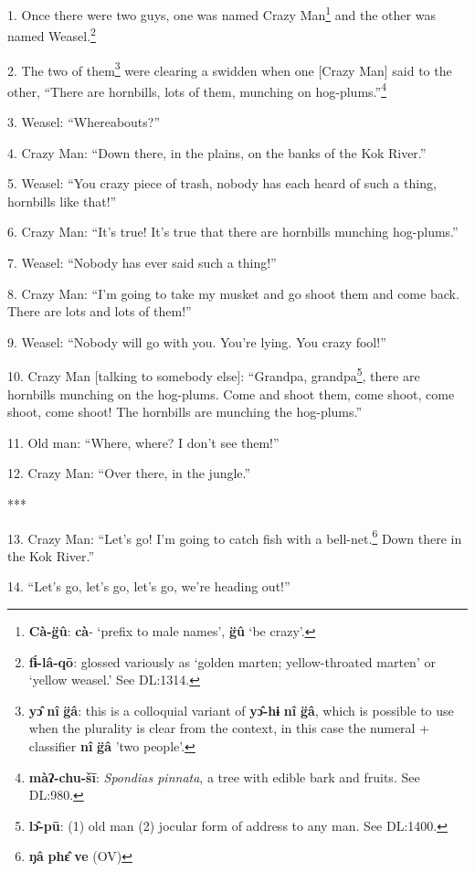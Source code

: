 \setcounter{footnote}{0}

1. Once there were two guys, one was named Crazy Man\footnote{\textbf{Cà-g̈û}: \textbf{cà}- `prefix to male names', \textbf{g̈û} `be crazy'.} and the other was named
Weasel.\footnote{\textbf{fɨ́-lâ-qō}: glossed variously as `golden marten; yellow-throated marten' or `yellow weasel.' See DL:1314.}

2. The two of them\footnote{\textbf{yɔ̂} \textbf{nî} \textbf{g̈â}: this is a colloquial variant of \textbf{yɔ̂-hɨ} \textbf{nî} \textbf{g̈â}, which is possible to use when the plurality is clear from the context, in this case the numeral + classifier \textbf{nî} \textbf{g̈â} 'two people'.} were clearing a swidden when one [Crazy Man] said to the
other, ``There are hornbills, lots of them, munching on hog-plums.''\footnote{\textbf{màʔ-chu-šī}: \textit{Spondias pinnata}, a tree with edible bark and fruits. See DL:980.}

3. Weasel: ``Whereabouts?''

4. Crazy Man: ``Down there, in the plains, on the banks of the Kok River.''

5. Weasel: ``You crazy piece of trash, nobody has each heard of such a thing, hornbills
like that!''

6. Crazy Man: ``It's true! It's true that there are hornbills munching hog-plums.''

7. Weasel: ``Nobody has ever said such a thing!''

8. Crazy Man: ``I'm going to take my musket and go shoot them and come back. There
are lots and lots of them!''

9. Weasel: ``Nobody will go with you. You're lying. You crazy fool!''

10. Crazy Man [talking to somebody else]: ``Grandpa, grandpa\footnote{\textbf{lɔ̂-pū}: (1) old man (2) jocular form of address to any man. See DL:1400.}, there are hornbills
munching on the hog-plums. Come and shoot them, come shoot, come shoot, come shoot!
The hornbills are munching the hog-plums.''

11. Old man: ``Where, where? I don't see them!''

12. Crazy Man: ``Over there, in the jungle.''

***

13. Crazy Man: ``Let's go! I'm going to catch fish with a bell-net.\footnote{\textbf{ŋâ} \textbf{phɛ̂} \textbf{ve} (OV)} Down there
in the Kok River.''

14. ``Let's go, let's go, let's go, we're heading out!''

